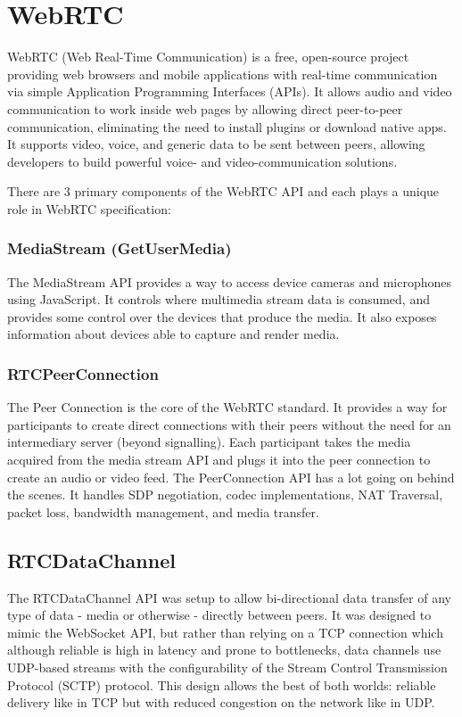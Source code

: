 \section{WebRTC}

WebRTC (Web Real-Time Communication) is a free, open-source project providing web browsers and 
mobile applications with real-time communication via simple Application Programming Interfaces (APIs). 
It allows audio and video communication to work inside web pages by allowing direct peer-to-peer 
communication, eliminating the need to install plugins or download native apps.
It supports video, voice, and generic data to be sent between peers, allowing developers 
to build powerful voice- and video-communication solutions.~\cite{wikiWebRTC}

There are 3 primary components of the WebRTC API and each plays a unique role in WebRTC specification:

\subsubsection{MediaStream (GetUserMedia)}

The MediaStream API provides a way to access device cameras and microphones using JavaScript. 
It controls where multimedia stream data is consumed, and provides some control over the devices 
that produce the media. It also exposes information about devices able to capture and render media.

\subsubsection{RTCPeerConnection}

The Peer Connection is the core of the WebRTC standard. It provides a way for participants to 
create direct connections with their peers without the need for an intermediary 
server (beyond signalling). Each participant takes the media acquired from the media 
stream API and plugs it into the peer connection to create an audio or video feed.  
The PeerConnection API has a lot going on behind the scenes. It handles SDP negotiation, 
codec implementations, NAT Traversal, packet loss, bandwidth management, and media transfer.

\subsection{RTCDataChannel}

The RTCDataChannel API was setup to allow bi-directional data transfer of any 
type of data - media or otherwise - directly between peers. It was designed to mimic the 
WebSocket API, but rather than relying on a TCP connection which although reliable is high 
in latency and prone to bottlenecks, data channels use UDP-based streams with the configurability 
of the Stream Control Transmission Protocol (SCTP) protocol. This design allows the best 
of both worlds: reliable delivery like in TCP but with reduced congestion on the network like in UDP.

